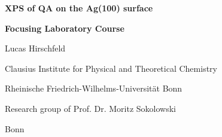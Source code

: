 \begin{titlepage}
	\centering
	{\scshape\LARGE \par}
	\vspace{1cm}
	{\huge\bfseries \textsf{\Acf{XPS} of \Acf{QA} on the Ag(100) surface}\par}
	\vspace{3 cm}
	{\Large\bfseries Focusing Laboratory Course \par}
	\vspace{3cm}
    {\large Lucas Hirschfeld\par}
	\vspace{3cm}
    {\large Clausius Institute for Physical and Theoretical Chemistry \par
	Rheinische Friedrich-Wilhelms-Universität Bonn\par}
	\vspace{2.5cm}
    {\large Research group of Prof. Dr. Moritz Sokolowski\par}
	\vfill
	{\large Bonn
	\the\year{}}
\end{titlepage}


\cleardoublepage

\thispagestyle{empty}
\tableofcontents
\cleardoublepage